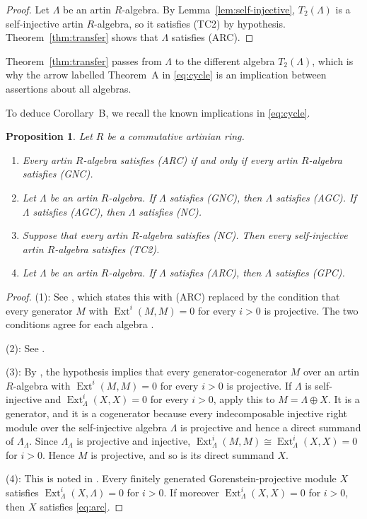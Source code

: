\documentclass[a4paper,reqno,10pt]{amsart}
\newtheorem{proposition}[theorem]{Proposition}
\theoremstyle{definition}
\numberwithin{equation}{section}
\newcommand{\Ext}{\operatorname{Ext}}
\newcommand{\ARC}{\textup{(ARC)}}
\newcommand{\GNC}{\textup{(GNC)}}
\newcommand{\AGC}{\textup{(AGC)}}
\newcommand{\NC}{\textup{(NC)}}
\newcommand{\TCtwo}{\textup{(TC2)}}
\newcommand{\GPC}{\textup{(GPC)}}
\begin{document}
\begin{proof}
Let $\Lambda$ be an artin $R$-algebra.  By Lemma~\ref{lem:self-injective},
$T_2(\Lambda)$ is a self-injective artin $R$-algebra, so it satisfies \TCtwo{} by
hypothesis.  Theorem~\ref{thm:transfer} shows that $\Lambda$ satisfies \ARC.
\end{proof}

Theorem~\ref{thm:transfer} passes from $\Lambda$ to the different algebra
$T_2(\Lambda)$, which is why the arrow labelled Theorem~A in \eqref{eq:cycle} is an
implication between assertions about all algebras.

To deduce Corollary~B, we recall the known implications in
\eqref{eq:cycle}.

\begin{proposition}\label{prop:classical}
Let $R$ be a commutative artinian ring.
\begin{enumerate}
\item Every artin $R$-algebra satisfies \ARC{} if and only if every artin
      $R$-algebra satisfies \GNC.
\item Let $\Lambda$ be an artin $R$-algebra.  If $\Lambda$ satisfies \GNC,
      then $\Lambda$ satisfies \AGC.  If $\Lambda$ satisfies \AGC, then
      $\Lambda$ satisfies \NC.
\item Suppose that every artin $R$-algebra satisfies \NC.  Then every
      self-injective artin $R$-algebra satisfies \TCtwo.
\item Let $\Lambda$ be an artin $R$-algebra.  If $\Lambda$ satisfies \ARC,
      then $\Lambda$ satisfies \GPC.
\end{enumerate}
\end{proposition}

\begin{proof}
(1): See \cite[Theorem~1.1]{AR}, which states this with \ARC{} replaced by the
condition that every generator $M$ with $\Ext^i(M,M)=0$ for every $i>0$ is
projective.  The two conditions agree for each algebra
\cite[pp.~283--284]{ADS}.

(2): See \cite[\S3.3]{TH}.

(3): By \cite[Corollary~1.2 and the remark following it]{AR}, the hypothesis
implies that every generator-cogenerator $M$ over an artin $R$-algebra with
$\Ext^i(M,M)=0$ for every $i>0$ is projective.  If $\Lambda$ is
self-injective and $\Ext_\Lambda^i(X,X)=0$ for every $i>0$, apply this to
$M=\Lambda\oplus X$.  It is a generator, and it is a cogenerator because
every indecomposable injective right module over the self-injective algebra
$\Lambda$ is projective and hence a direct summand of $\Lambda_\Lambda$.
Since $\Lambda_\Lambda$ is projective and injective,
$\Ext_\Lambda^i(M,M)\cong\Ext_\Lambda^i(X,X)=0$ for $i>0$.  Hence $M$ is
projective, and so is its direct summand $X$.

(4): This is noted in \cite{LH}.  Every finitely generated
Gorenstein-projective module $X$ satisfies $\Ext_\Lambda^i(X,\Lambda)=0$ for
$i>0$.  If moreover $\Ext_\Lambda^i(X,X)=0$ for $i>0$, then $X$ satisfies
\eqref{eq:arc}.
\end{proof}
\end{document}

